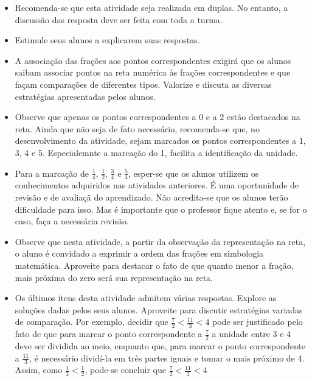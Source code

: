 \documentclass[oneside]{book}
\begin{document}
\begin{multicols}{2}
\begin{itemize}
    \item       Recomenda-se que esta atividade seja realizada em duplas. No entanto, a discussão das resposta deve ser feita com toda a turma.
    \item       Estimule seus alunos a explicarem suas respostas.
    \item       A associação das frações aos pontos correspondentes exigirá que os alunos saibam associar pontos na reta numérica às frações correspondentes e que façam comparações de diferentes tipos. Valorize e discuta as diversas estratégias apresentadas pelos alunos. 
    \item       Observe que apenas os pontos correspondentes a       $0$       e a       $2$       estão destacados na reta. Ainda que não seja de fato necessário, recomenda-se que, no desenvolvimento da atividade, sejam marcados os pontos correspondentes a 1, 3, 4 e 5. Especialemnte a marcação do 1, facilita a identificação da unidade.
    \item       Para a marcação de       $\frac{1}{4}$,       $\frac{1}{2}$,       $\frac{3}{4}$       e       $\frac{5}{4}$, esper-se que os alunos utilizem os conhecimentos adquiridos nas atividades anteriores. É uma oportunidade de revisão e de avaliaçã do aprendizado. Não acredita-se que os alunos terão dificuldade para isso. Mas é importante que o professor fique atento e, se for o caso, faça a necessária revisão. 
    \item       Observe que nesta atividade, a partir da observação da representação na reta, o aluno é convidado a exprimir a ordem das frações em simbologia matemática. Aproveite para destacar o fato de que quanto menor a fração, mais próxima do zero será sua representação na reta. 
    \item       Os últimos itens desta atividade admitem várias respostas. Explore as soluções dadas pelos seus alunos. Aproveite para discutir estratégias variadas de comparação. Por exemplo, decidir que       $\frac{7}{2} < \frac{11}{3} < 4$       pode ser justificado pelo fato de que para marcar o ponto correspondente a       $\frac{7}{2}$       a unidade entre 3 e 4 deve ser dividida ao meio, enquanto que, para marcar o ponto correspondente a       $\frac{11}{3}$, é necessário dividí-la em três partes iguais e tomar o mais próximo de 4. Assim, como       $\frac{1}{3} < \frac{1}{2}$, pode-se concluir que       $\frac{7}{2} < \frac{11}{3} < 4$
\end{itemize} %
  


\end{multicols}
\end{document}
